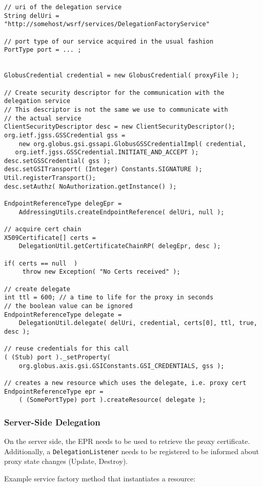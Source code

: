 \documentclass{article}
\begin{document}
\begin{verbatim}
// uri of the delegation service
String delUri =  "http://somehost/wsrf/services/DelegationFactoryService"

// port type of our service acquired in the usual fashion
PortType port = ... ;


GlobusCredential credential = new GlobusCredential( proxyFile );

// Create security descriptor for the communication with the delegation service
// This descriptor is not the same we use to communicate with
// the actual service
ClientSecurityDescriptor desc = new ClientSecurityDescriptor();
org.ietf.jgss.GSSCredential gss = 
    new org.globus.gsi.gssapi.GlobusGSSCredentialImpl( credential, 
   org.ietf.jgss.GSSCredential.INITIATE_AND_ACCEPT );
desc.setGSSCredential( gss );
desc.setGSITransport( (Integer) Constants.SIGNATURE );
Util.registerTransport();
desc.setAuthz( NoAuthorization.getInstance() );

EndpointReferenceType delegEpr = 
    AddressingUtils.createEndpointReference( delUri, null );

// acquire cert chain 
X509Certificate[] certs = 
    DelegationUtil.getCertificateChainRP( delegEpr, desc );

if( certs == null  )
     throw new Exception( "No Certs received" );

// create delegate
int ttl = 600; // a time to life for the proxy in seconds 
// the boolean value can be ignored
EndpointReferenceType delegate = 
    DelegationUtil.delegate( delUri, credential, certs[0], ttl, true, desc );

// reuse credentials for this call
( (Stub) port )._setProperty( 
    org.globus.axis.gsi.GSIConstants.GSI_CREDENTIALS, gss ); 

// creates a new resource which uses the delegate, i.e. proxy cert
EndpointReferenceType epr = 
    ( (SomePortType) port ).createResource( delegate );
\end{verbatim}

\subsubsection{Server-Side Delegation}

On the server side, the EPR needs to be used to retrieve the proxy
certificate. Additionally, a \verb!DelegationListener! needs to be
registered to be informed about proxy state changes (Update,
Destroy).

Example service factory method that instantiates a resource:
\end{document}
